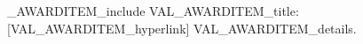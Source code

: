         \ifVAL_AWARDITEM_include
        {VAL_AWARDITEM_title:}
        [VAL_AWARDITEM_hyperlink]
        VAL_AWARDITEM_details.
        \fi
